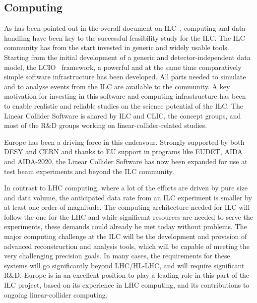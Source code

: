 \documentclass[%
 reprint,
 floatfix,
 amsmath,amssymb,
 aps,
]{revtex4-1}
\begin{document}
\subsection{Computing}
As has been pointed out in the overall document on ILC~\cite{ILCESU1}, computing and data 
handling have been key to the successful feasibility study for the ILC. The ILC community 
has from the start invested in generic and widely usable tools. Starting from 
the initial development of a generic and detector-independent data model, the 
LCIO~\cite{bib:lcio} framework, a powerful and at the same time comparatively simple software 
infrastructure has been developed. All parts needed to simulate and to analyse 
events from the ILC are available to the community. A key motivation for investing
in this software and computing infrastructure has been to enable realistic and reliable 
studies on the science potential of the ILC. The Linear Collider Software is shared by ILC and 
CLIC, the concept groups, and most of the R\&D groups working on linear-collider-related 
studies. 

Europe has been a driving force in this endeavour. Strongly 
supported by both DESY and CERN and thanks to EU support in programs like EUDET, 
AIDA and AIDA-2020, the Linear Collider Software has now been expanded for use at test 
beam experiments and beyond the ILC     community.

In contrast to LHC computing, where a lot of the efforts are driven by pure 
size and data volume, the anticipated data rate from an ILC experiment is 
smaller by at least one order of magnitude. The computing architecture needed for 
ILC will follow the one for the LHC and while significant resources are needed 
to serve the experiments, these demands could already be met today without problems. 
The major computing challenge at the ILC will be the development and provision 
of advanced reconstruction and analysis tools, which will be capable of meeting 
the very challenging precision goals. In many cases, the requirements 
for these systems will go significantly beyond LHC/HL-LHC, 
and will require significant R\&D. Europe is in an excellent position to play a 
leading role in this part of the ILC project, based on its experience in LHC 
computing, and its contributions to ongoing linear-collider computing. 
\end{document}
